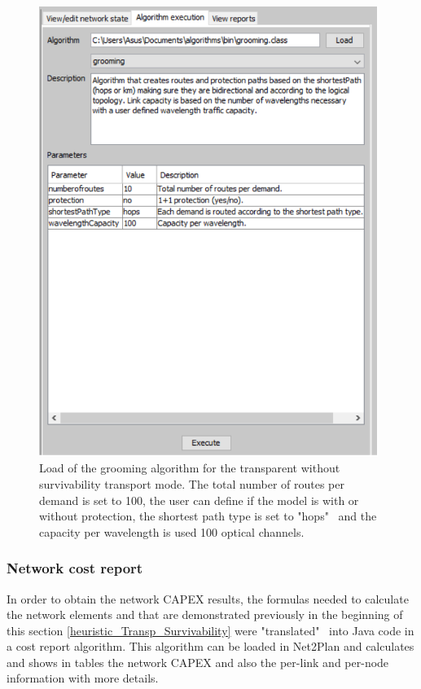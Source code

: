 \begin{figure}[H]
\centering
\includegraphics[width=11cm]{sdf/heuristic/transparent_survivability/figures/grooming_transparent_surv4}
\caption{Load of the grooming algorithm for the transparent without survivability transport mode. The total number of routes per demand is set to 100, the user can define if the model is with or without protection, the shortest path type is set to "hops" \ and the capacity per wavelength is used 100 optical channels.}
\label{grooming_transparent_surv4}
\end{figure}

\subsubsection{Network cost report}

\vspace{11pt}
In order to obtain the network CAPEX results, the formulas needed to calculate the network elements and that are demonstrated previously in the beginning of this section \ref{heuristic_Transp_Survivability} were "translated" \ into Java code in a cost report algorithm. This algorithm can be loaded in Net2Plan and calculates and shows in tables the network CAPEX and also the per-link and per-node information with more details.

